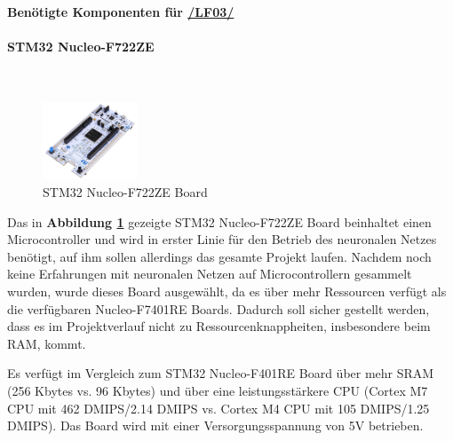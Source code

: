 \textbf{Benötigte Komponenten für \hyperlink{lf-nn-01}{/LF03/}} \\

\paragraph{STM32 Nucleo-F722ZE}\mbox{}\\

\begin{figure} %
	\vspace{-10pt}
	\hspace{20pt}
	\includegraphics[width=0.25\textwidth]{images/05_technische_spezifikation/nn/nucleo_f722ze.jpg}
	\caption{STM32 Nucleo-F722ZE Board}
	\label{fig:nucleo-f722ze}
\end{figure}


Das in \textbf{Abbildung \ref{fig:nucleo-f722ze}} gezeigte STM32 Nucleo-F722ZE Board beinhaltet einen Microcontroller und wird in erster Linie für den Betrieb des neuronalen Netzes benötigt, auf ihm sollen allerdings das gesamte Projekt laufen. Nachdem noch keine Erfahrungen mit neuronalen Netzen auf Microcontrollern gesammelt wurden, wurde dieses Board ausgewählt, da es über mehr Ressourcen verfügt als die verfügbaren Nucleo-F7401RE Boards. Dadurch soll sicher gestellt werden, dass es im Projektverlauf nicht zu Ressourcenknappheiten, insbesondere beim RAM,  kommt.

Es verfügt im Vergleich zum STM32 Nucleo-F401RE Board über mehr SRAM (256 Kbytes vs. 96 Kbytes) und über eine leistungsstärkere CPU (Cortex M7 CPU mit 462 DMIPS/2.14 DMIPS vs. Cortex M4 CPU mit 105 DMIPS/1.25 DMIPS).
Das Board wird mit einer Versorgungsspannung von 5V betrieben. \cite{stm32F7-board}